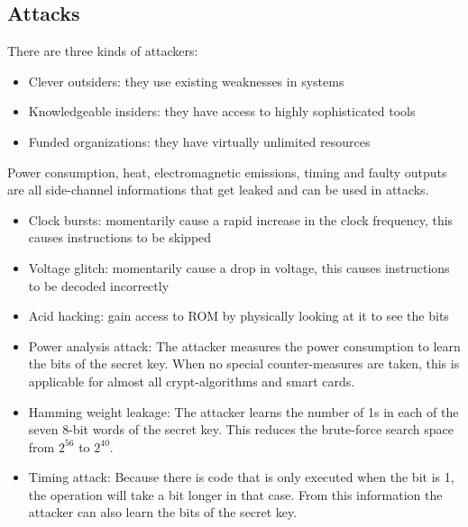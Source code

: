 \subsection{Attacks}
\begin{mytitle} There are three kinds of attackers:
\begin{itemize}
    \item Clever outsiders: they use existing weaknesses in systems
    \item Knowledgeable insiders: they have access to highly sophisticated tools
    \item Funded organizations: they have virtually unlimited resources
\end{itemize}
\end{mytitle}
\begin{mytitle}[Leakage] Power consumption, heat, electromagnetic emissions, timing and faulty outputs are all side-channel informations that get leaked and can be used in attacks.
\end{mytitle}
\begin{mytitle}\hfill
\begin{itemize}
    \item Clock bursts: momentarily cause a rapid increase in the clock frequency, this causes instructions to be skipped
    \item Voltage glitch: momentarily cause a drop in voltage, this causes instructions to be decoded incorrectly
    \item Acid hacking: gain access to ROM by physically looking at it to see the bits
\end{itemize}
\end{mytitle}
\begin{mytitle}\hfill
\begin{itemize}
    \item Power analysis attack: The attacker measures the power consumption to learn the bits of the secret key. When no special counter-measures are taken, this is applicable for almost all crypt-algorithms and smart cards.
    \item Hamming weight leakage: The attacker learns the number of 1s in each of the seven 8-bit words of the secret key. This reduces the brute-force search space from $2^{56}$ to $2^{40}$.
    \item Timing attack: Because there is code that is only executed when the bit is 1, the operation will take a bit longer in that case. From this information the attacker can also learn the bits of the secret key.
\end{itemize}
\end{mytitle}

